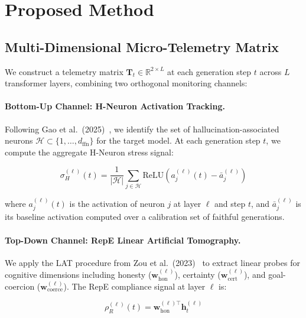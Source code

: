 \documentclass[10pt]{article}
\begin{document}
\section{Proposed Method}

\subsection{Multi-Dimensional Micro-Telemetry Matrix}

We construct a telemetry matrix $\mathbf{T}_t \in \mathbb{R}^{2 \times L}$ at each generation step $t$ across $L$ transformer layers, combining two orthogonal monitoring channels:

\paragraph{Bottom-Up Channel: H-Neuron Activation Tracking.}
Following Gao et al.\ (2025)~\cite{gao2025hneurons}, we identify the set of hallucination-associated neurons $\mathcal{H} \subset \{1, \ldots, d_{\text{ffn}}\}$ for the target model. At each generation step $t$, we compute the aggregate H-Neuron stress signal:

\begin{equation}
\sigma_H^{(\ell)}(t) = \frac{1}{|\mathcal{H}|} \sum_{j \in \mathcal{H}} \text{ReLU}\left(a_j^{(\ell)}(t) - \bar{a}_j^{(\ell)}\right)
\label{eq:hneuron_stress}
\end{equation}

where $a_j^{(\ell)}(t)$ is the activation of neuron $j$ at layer $\ell$ and step $t$, and $\bar{a}_j^{(\ell)}$ is its baseline activation computed over a calibration set of faithful generations.

\paragraph{Top-Down Channel: RepE Linear Artificial Tomography.}
We apply the LAT procedure from Zou et al.\ (2023)~\cite{zou2023repe} to extract linear probes for cognitive dimensions including honesty ($\mathbf{w}_{\text{hon}}^{(\ell)}$), certainty ($\mathbf{w}_{\text{cert}}^{(\ell)}$), and goal-coercion ($\mathbf{w}_{\text{coerce}}^{(\ell)}$). The RepE compliance signal at layer $\ell$ is:

\begin{equation}
\rho_R^{(\ell)}(t) = \mathbf{w}_{\text{hon}}^{(\ell)\top} \mathbf{h}_t^{(\ell)}
\label{eq:repe_signal}
\end{equation}
\end{document}
